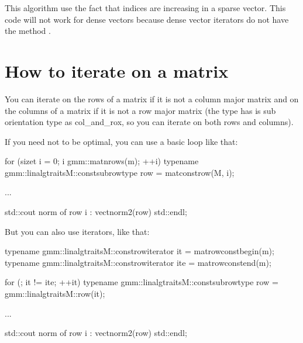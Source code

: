 \documentclass[a4paper,11pt,english]{sphinxmanual}
\begin{document}
\sphinxAtStartPar
This algorithm use the fact that indices are increasing in a sparse vector. This code will not work for dense vectors because dense vector iterators do not have the method .


\section{How to iterate on a matrix}
\label{\detokenize{gmm/inside:how-to-iterate-on-a-matrix}}
\sphinxAtStartPar
You can iterate on the rows of a matrix if it is not a column major matrix and on the columns of a matrix if it is not a row major matrix (the type  has is sub orientation type as col\_and\_rox, so you can iterate on both rows and columns).

\sphinxAtStartPar
If you need not to be optimal, you can use a basic loop like that:

\begin{sphinxVerbatim}[commandchars=\\\{\}]
for (size\PYGZus{}t i = 0; i \PYGZlt{} gmm::mat\PYGZus{}nrows(m); ++i) \PYGZob{}
  typename gmm::linalg\PYGZus{}traits\PYGZlt{}M\PYGZgt{}::const\PYGZus{}sub\PYGZus{}row\PYGZus{}type row = mat\PYGZus{}const\PYGZus{}row(M, i);

  ...

  std::cout \PYGZlt{}\PYGZlt{} \PYGZdq{}norm of row \PYGZdq{} \PYGZlt{}\PYGZlt{} i \PYGZlt{}\PYGZlt{} \PYGZdq{} : \PYGZdq{} \PYGZlt{}\PYGZlt{} vect\PYGZus{}norm2(row) \PYGZlt{}\PYGZlt{} std::endl;
\PYGZcb{}
\end{sphinxVerbatim}

\sphinxAtStartPar
But you can also use iterators, like that:

\begin{sphinxVerbatim}[commandchars=\\\{\}]
typename gmm::linalg\PYGZus{}traits\PYGZlt{}M\PYGZgt{}::const\PYGZus{}row\PYGZus{}iterator it = mat\PYGZus{}row\PYGZus{}const\PYGZus{}begin(m);
typename gmm::linalg\PYGZus{}traits\PYGZlt{}M\PYGZgt{}::const\PYGZus{}row\PYGZus{}iterator ite = mat\PYGZus{}row\PYGZus{}const\PYGZus{}end(m);

for (; it != ite; ++it) \PYGZob{}
  typename gmm::linalg\PYGZus{}traits\PYGZlt{}M\PYGZgt{}::const\PYGZus{}sub\PYGZus{}row\PYGZus{}type
    row = gmm::linalg\PYGZus{}traits\PYGZlt{}M\PYGZgt{}::row(it);

  ...

  std::cout \PYGZlt{}\PYGZlt{} \PYGZdq{}norm of row \PYGZdq{} \PYGZlt{}\PYGZlt{} i \PYGZlt{}\PYGZlt{} \PYGZdq{} : \PYGZdq{} \PYGZlt{}\PYGZlt{} vect\PYGZus{}norm2(row) \PYGZlt{}\PYGZlt{} std::endl;
\PYGZcb{}
\end{sphinxVerbatim}
\end{document}
